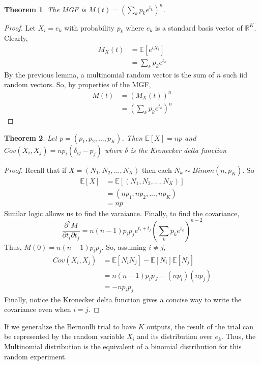 \documentclass{article}
\newtheorem{theorem}{Theorem}
\theoremstyle{definition}\newtheorem{definition}{DEF}
\theoremstyle{definition}\newtheorem{example}{Ex}
\theoremstyle{lemma}\newtheorem{lemma}{Lemma}
\theoremstyle{corrolary}\newtheorem{corrolary}{Cor}
\begin{document}
\begin{theorem}
The MGF is $M(t)=\left(\sum_k p_k e^{t_k}\right)^n$.
\end{theorem}
\begin{proof}
Let $X_i=e_k$ with probability $p_k$ where $e_k$ is a standard basis vector of $\mathbb{R}^K$.
Clearly,
\begin{align*}
M_X(t)
&=\mathbb{E}[e^{t X_i}]\\
&=\sum_k p_k e^{t_k}
\end{align*}
By the previous lemma, a multinomial random vector is the sum of $n$ such iid random vectors.
So, by properties of the MGF,
\begin{align*}
M(t)&=(M_X(t))^n\\
&=\left( \sum_k p_k e^{t_k}\right)^n
\end{align*}
\end{proof}

\begin{theorem}
Let $p=(p_1, p_2, ..., p_K)$.
Then $\mathbb{E}[X]=np$ and $Cov(X_i, X_j)=np_i (\delta_{ij}-p_j)$ where $\delta$ is the Kronecker delta function
\end{theorem}
\begin{proof}
Recall that if $X=(N_1, N_2, ..., N_K)$ then each $N_k\sim Binom(n,p_K)$.
So
\begin{align*}
\mathbb{E}[X]&=\mathbb{E}[(N_1, N_2, ..., N_K)]\\
&=(np_1, np_2, ..., np_K)\\
&=np
\end{align*}
Similar logic allows us to find the varaiance.
Finally, to find the covariance,
\begin{equation*}
\frac{\partial^2 M}{\partial t_i \partial t_j} =n (n-1) p_i p_j e^{t_i+t_j}\left( \sum_k p_k e^{t_k}\right)^{n-2}
\end{equation*}
Thus, $M(0)=n(n-1)p_i p_j$.
So, assuming $i\neq j$,
\begin{align*}
Cov(X_i, X_j)&=\mathbb{E}[N_i N_j] - \mathbb{E}[N_i]\mathbb{E}[N_j]\\
&=n(n-1)p_i p_J - (np_i)(np_j)\\
&=-np_ip_j
\end{align*}
Finally, notice the Kronecker delta function gives a concise way to write the covariance even when $i=j$.
\end{proof}

If we generalize the Bernoulli trial to have $K$ outputs, the result of the trial can be represented by the random variable $X_i$ and its distribution over $e_k$.
Thus, the Multinomial distribution is the equivalent of a binomial distribution for this random experiment.
\end{document}
